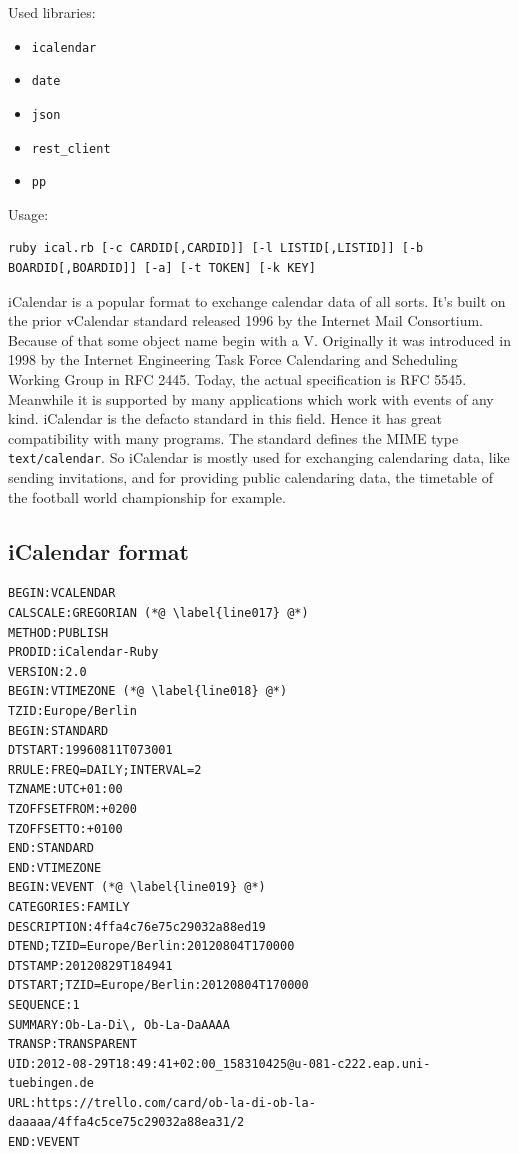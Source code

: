 Used libraries:
\begin{itemize}
	\item \texttt{icalendar}
	\item \texttt{date}
	\item \texttt{json}
	\item \texttt{rest\_client}
	\item \texttt{pp}
\end{itemize}

Usage:
\begin{lstlisting}[aboveskip=1\baselineskip, style=bash, caption=\texttt{ical.rb} usage., label=listing023]
ruby ical.rb [-c CARDID[,CARDID]] [-l LISTID[,LISTID]] [-b BOARDID[,BOARDID]] [-a] [-t TOKEN] [-k KEY]
\end{lstlisting}

iCalendar is a popular format to exchange calendar data of all sorts. It's built on the prior vCalendar standard released 1996 by the Internet Mail Consortium. \cite{vcalendar} Because of that some object name begin with a V. Originally it was introduced in 1998 by the Internet Engineering Task Force Calendaring and Scheduling Working Group in RFC 2445. \cite{rfc:2445} Today, the actual specification is RFC 5545. \cite{rfc:5545} Meanwhile it is supported by many applications which work with events of any kind. iCalendar is the defacto standard in this field. Hence it has great compatibility with many programs.  The standard defines the MIME type \texttt{text/calendar}. So iCalendar is mostly used for exchanging calendaring data, like sending invitations, and for providing public calendaring data, the timetable of the football world championship for example.

\subsection{iCalendar format}

\begin{lstlisting}[aboveskip=1\baselineskip, style=bash, caption=iCalendar example., label=listing024]
BEGIN:VCALENDAR
CALSCALE:GREGORIAN (*@ \label{line017} @*)
METHOD:PUBLISH
PRODID:iCalendar-Ruby
VERSION:2.0
BEGIN:VTIMEZONE (*@ \label{line018} @*)
TZID:Europe/Berlin
BEGIN:STANDARD
DTSTART:19960811T073001
RRULE:FREQ=DAILY;INTERVAL=2
TZNAME:UTC+01:00
TZOFFSETFROM:+0200
TZOFFSETTO:+0100
END:STANDARD
END:VTIMEZONE
BEGIN:VEVENT (*@ \label{line019} @*)
CATEGORIES:FAMILY
DESCRIPTION:4ffa4c76e75c29032a88ed19
DTEND;TZID=Europe/Berlin:20120804T170000
DTSTAMP:20120829T184941
DTSTART;TZID=Europe/Berlin:20120804T170000
SEQUENCE:1
SUMMARY:Ob-La-Di\, Ob-La-DaAAAA
TRANSP:TRANSPARENT
UID:2012-08-29T18:49:41+02:00_158310425@u-081-c222.eap.uni-tuebingen.de
URL:https://trello.com/card/ob-la-di-ob-la-daaaaa/4ffa4c5ce75c29032a88ea31/2
END:VEVENT
\end{lstlisting}

